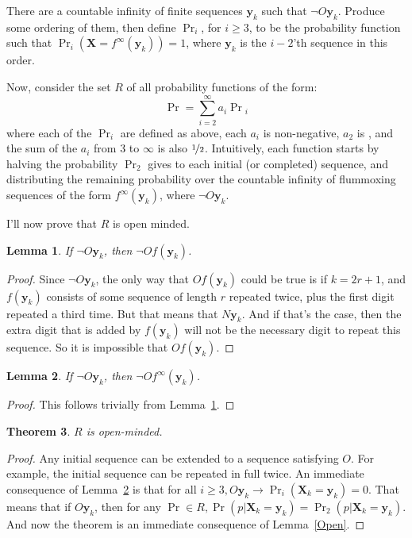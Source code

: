 \documentclass{ergoclass}
\newtheorem{theorem}{Theorem}%
\newtheorem{lemma}[theorem]{Lemma}
\newcommand{\vX}{\boldsymbol{X}}
\newcommand{\vy}{\boldsymbol{y}}
\begin{document}
There are a countable infinity of finite sequences $\vy_k$ such that $\neg O \vy_k$. Produce some ordering of them, then define $\Pr_i$, for $i \geq 3$, to be the probability function such that $\Pr_i(\vX = f^\infty(\vy_k)) = 1$, where $\vy_k$ is the $i-2$'th sequence in this order.

Now, consider the set $R$ of all probability functions of the form:
\begin{equation*}
\Pr = \sum_{i = 2}^\infty a_i\Pr{}_i
\end{equation*}
%
\noindent where each of the $\Pr_i$ are defined as above, each $a_i$ is non-negative, $a_2$ is , and the sum of the $a_i$ from 3 to $\infty$ is also $\nicefrac{1}{2}$. Intuitively, each function starts by halving the probability $\Pr_2$ gives to each initial (or completed) sequence, and distributing the remaining probability over the countable infinity of flummoxing sequences of the form $f^\infty(\vy_k)$, where $\neg O\vy_k$.

I'll now prove that $R$ is open minded.

\begin{lemma}
\label{NoNewO}
If $\neg O \vy_k$, then $\neg O f(\vy_k)$.
\end{lemma}
\begin{proof}
Since $\neg O \vy_k$, the only way that $O f(\vy_k)$ could be true is if $k = 2r +1$, and $f(\vy_k)$ consists of some sequence of length $r$ repeated twice, plus the first digit repeated a third time. But that means that $N\vy_k$. And if that's the case, then the extra digit that is added by $f(\vy_k)$ will not be the necessary digit to repeat this sequence. So it is impossible that $O f(\vy_k)$.
\end{proof}
\begin{lemma}
\label{StillNoNewO}
If $\neg O \vy_k$, then $\neg O f^\infty(\vy_k)$.
\end{lemma}
\begin{proof}
This follows trivially from Lemma~\ref{NoNewO}.
\end{proof}

\begin{theorem}
\label{ROpen}
$R$ is open-minded.
\end{theorem}
\begin{proof}
Any initial sequence can be extended to a sequence satisfying $O$. For example, the initial sequence can be repeated in full twice. An immediate consequence of Lemma~\ref{StillNoNewO} is that for all $i \geq 3,  O\vy_k \rightarrow \Pr_i(\vX_k = \vy_k) = 0$. That means that if $O\vy_k$, then for any $\Pr \in R,{ } \Pr(p | \vX_k = \vy_k) = \Pr_2(p | \vX_k = \vy_k)$. And now the theorem is an immediate consequence of Lemma~\ref{Open}.
\end{proof}
\end{document}
